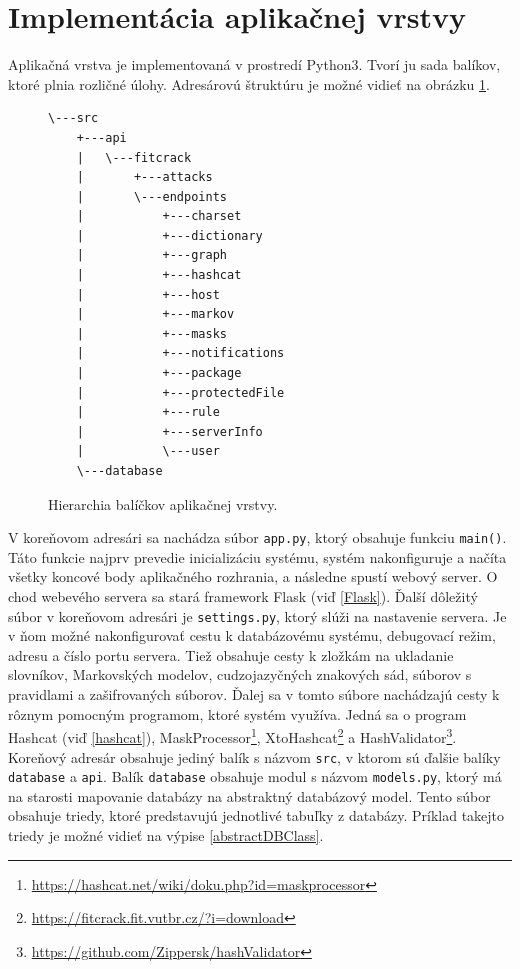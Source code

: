 \documentclass[slovak]{fitthesis}
\begin{document}
\section{Implementácia aplikačnej vrstvy}
Aplikačná vrstva je implementovaná v prostredí Python3. Tvorí ju sada balíkov, ktoré plnia rozličné úlohy. Adresárovú štruktúru je možné vidieť na obrázku \ref{fig:serverStructure}.
\begin{figure}[H]
\begin{center}
\begin{varwidth}{\linewidth}
\begin{verbatim}
\---src
    +---api
    |   \---fitcrack
    |       +---attacks
    |       \---endpoints
    |           +---charset
    |           +---dictionary
    |           +---graph
    |           +---hashcat
    |           +---host
    |           +---markov
    |           +---masks
    |           +---notifications
    |           +---package
    |           +---protectedFile
    |           +---rule
    |           +---serverInfo
    |           \---user
    \---database
\end{verbatim}
\end{varwidth}
\end{center}
\caption{Hierarchia balíčkov aplikačnej vrstvy.}
\label{fig:serverStructure}
\end{figure}
V koreňovom adresári sa nachádza súbor \texttt{app.py}, ktorý obsahuje funkciu \texttt{main()}. Táto funkcie najprv prevedie inicializáciu systému, systém nakonfiguruje a načíta všetky koncové body aplikačného rozhrania, a následne spustí webový server. O chod webevého servera sa stará framework Flask (viď \ref{Flask}). Ďalší dôležitý súbor v koreňovom adresári je \texttt{settings.py}, ktorý slúži na nastavenie servera. Je v ňom možné nakonfigurovať cestu k databázovému systému, debugovací režim, adresu a číslo portu servera. Tiež obsahuje cesty k zložkám na ukladanie slovníkov, Markovských modelov, cudzojazyčných znakových sád, súborov s pravidlami a zašifrovaných súborov. Ďalej sa v tomto súbore nachádzajú cesty k rôznym pomocným programom, ktoré systém využíva. Jedná sa o program Hashcat (viď \ref{hashcat}), MaskProcessor\footnote{\url{https://hashcat.net/wiki/doku.php?id=maskprocessor}}, XtoHashcat\footnote{\url{https://fitcrack.fit.vutbr.cz/?i=download}} a HashValidator\footnote{\url{https://github.com/Zippersk/hashValidator}}. Koreňový adresár obsahuje jediný balík s názvom \texttt{src}, v ktorom sú ďalšie balíky \texttt{database} a \texttt{api}. Balík \texttt{database} obsahuje modul s názvom \texttt{models.py}, ktorý má na starosti mapovanie databázy na abstraktný databázový model. Tento súbor obsahuje triedy, ktoré predstavujú jednotlivé tabuľky z databázy. Príklad takejto triedy je možné vidieť na výpise \ref{abstractDBClass}. 
\end{document}
